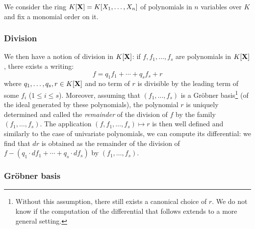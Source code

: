 \documentclass{lms}
\begin{document}
We consider the ring $K[\mathbf X] = K[X_1, \ldots, X_n]$ of polynomials in $n$
variables over $K$ and fix a monomial order on it. 

\subsubsection*{Division}

We then have a notion of division in $K[\mathbf X]$: if $f, f_1, \ldots, f_s$ 
are polynomials in $K[\mathbf X]$, there exists a writing:
$$f = q_1 f_1 + \cdots + q_s f_s + r$$
where $q_1, \ldots, q_s, r \in K[\mathbf X]$ and no term of $r$ is divisible
by the leading term of some $f_i$ ($1 \leq i \leq s$). Moreover, assuming
that $(f_1, \ldots, f_s)$ is a Gr\"obner basis\footnote{Without this
assumption, there still exists a canonical choice of $r$. We do not know
if the computation of the differential that follows extends to a more
general setting.} (of the ideal generated by these polynomials), the 
polynomial $r$ is uniquely determined and called the \emph{remainder} of 
the division of $f$ by the family $(f_1, \ldots, f_s)$. The application 
$(f, f_1, \ldots, f_s) \mapsto r$ is then well defined and similarly to 
the case of univariate polynomials, we can compute its differential: we 
find that $dr$ is obtained as the remainder of the division of $f - (q_1 
\cdot d f_1 + \cdots + q_s \cdot d f_s)$ by $(f_1, \ldots, f_s)$.

\subsubsection*{Gr\"obner basis}
\end{document}
